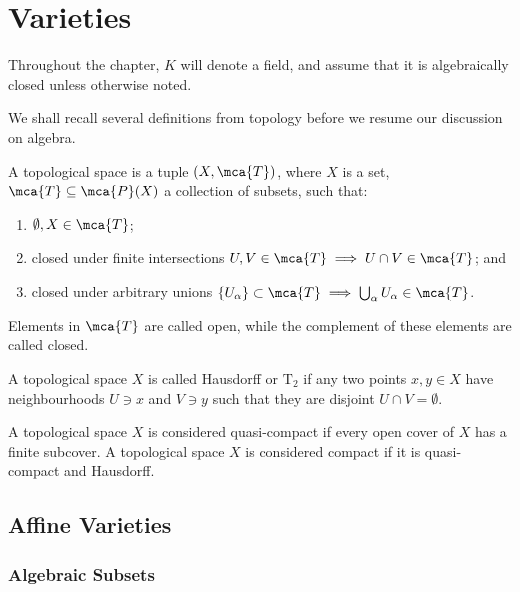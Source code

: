\chapter{Varieties}

\begin{remark}
    Throughout the chapter, \(K\) will denote a field,
    and assume that it is algebraically closed unless otherwise noted.
\end{remark}

\begin{remark}
    We shall recall several definitions from topology
    before we resume our discussion on algebra.
\end{remark}
\begin{definition}
    A topological space is a tuple \((X,\mca{T})\),
    where \(X\) is a set, \(\mca{T} \subseteq \mca{P}(X)\) a collection of subsets,
    such that:
    \begin{enumerate}[label={(\roman*)}, itemsep=0mm]
        \item \(\emptyset,X \in \mca{T}\);
        \item closed under finite intersections
            \(U,V \in \mca{T} \implies U \cap V \in \mca{T}\); and
        \item closed under arbitrary unions
            \({\{U_\alpha\}} \subset \mca{T} \implies \bigcup_\alpha U_\alpha \in \mca{T}\).
    \end{enumerate}
    Elements in \(\mca{T}\) are called open,
    while the complement of these elements are called closed.
\end{definition}
\begin{definition}
    A topological space \(X\) is called Hausdorff or \(\text{T}_2\)
    if any two points \(x,y \in X\) have neighbourhoods \(U \ni x\) and \(V \ni y\)
    such that they are disjoint \(U \cap V = \emptyset\).
\end{definition}
\begin{definition}
    A topological space \(X\) is considered quasi-compact
    if every open cover of \(X\) has a finite subcover.
    A topological space \(X\) is considered compact
    if it is quasi-compact and Hausdorff.
\end{definition}


\section{Affine Varieties}

\subsection*{Algebraic Subsets}

